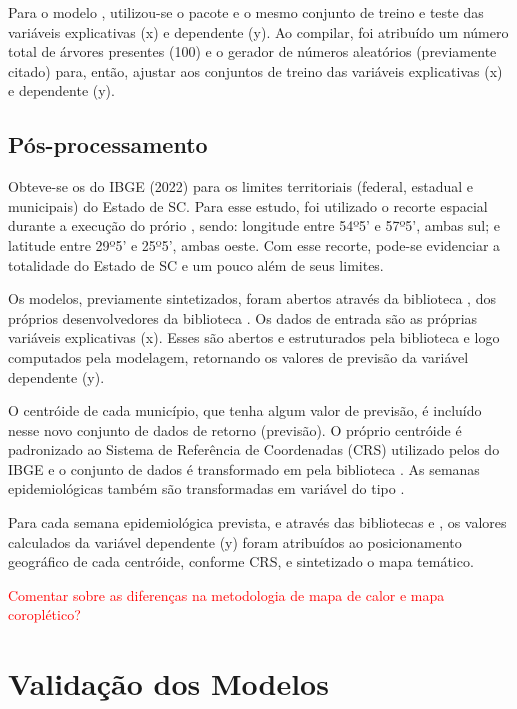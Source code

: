 \indent Para o modelo , utilizou-se o pacote  e o mesmo conjunto de treino e teste das variáveis explicativas (x) e dependente (y). Ao compilar, foi atribuído um número total de árvores presentes (100) e o gerador de números aleatórios (previamente citado) para, então, ajustar aos conjuntos de treino das variáveis explicativas (x) e dependente (y).

\subsection{Pós-processamento}

\indent Obteve-se os  do \acrshort{IBGE} (2022) para os limites territoriais (federal, estadual e municipais) do Estado de \acrlong{SC}. Para esse estudo, foi utilizado o recorte espacial durante a execução do prório , sendo: longitude entre 54º5' e 57º5', ambas sul; e latitude entre 29º5' e 25º5', ambas oeste. Com esse recorte, pode-se evidenciar a totalidade do Estado de \acrlong{SC} e um pouco além de seus limites.

\indent Os modelos, previamente sintetizados, foram abertos através da biblioteca , dos próprios desenvolvedores da biblioteca . Os dados de entrada são as próprias variáveis explicativas (x). Esses são abertos e estruturados pela biblioteca  e logo computados pela modelagem, retornando os valores de previsão da variável dependente (y).

\indent O centróide de cada município, que tenha algum valor de previsão, é incluído nesse novo conjunto de dados de retorno (previsão). O próprio centróide é padronizado ao Sistema de Referência de Coordenadas (\acrfull{CRS}) utilizado pelos  do \acrshort{IBGE} e o conjunto  de dados é transformado em  pela biblioteca . As semanas epidemiológicas também são transformadas em variável do tipo .

\indent Para cada semana epidemiológica prevista, e através das bibliotecas  e , os valores calculados da variável dependente (y) foram atribuídos ao posicionamento geográfico de cada centróide, conforme \acrshort{CRS}, e sintetizado o mapa temático.

\textcolor{red}{Comentar sobre as diferenças na metodologia de mapa de calor e mapa coroplético?}

\section{Validação dos Modelos}

